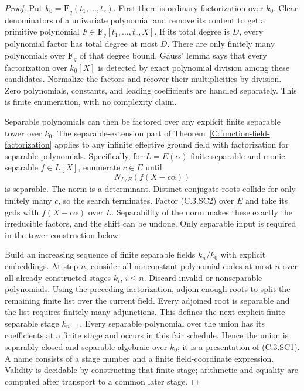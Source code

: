 \begin{proof}
Put $k_0=\mathbf F_q(t_1,\ldots,t_r)$.
First there is ordinary factorization over
$k_0$.  Clear denominators of a univariate
polynomial and remove its content to get
a primitive polynomial
$F\in\mathbf F_q[t_1,\ldots,t_r,X]$.
If its total degree is $D$, every polynomial
factor has total degree at most $D$.
There are only finitely many polynomials
over $\mathbf F_q$ of that degree bound.
Gauss' lemma says that every factorization
over $k_0[X]$ is detected by exact
polynomial division among these candidates.
Normalize the factors and recover their
multiplicities by division.
Zero polynomials, constants, and leading
coefficients are handled separately.
This is finite enumeration, with no
complexity claim.

Separable polynomials can then be factored
over any explicit finite separable tower
over $k_0$.  The separable-extension part
of Theorem~\ref{C:function-field-factorization}
applies to any infinite effective ground
field with factorization for separable
polynomials.  Specifically, for
$L=E(\alpha)$ finite separable and monic
separable $f\in L[X]$, enumerate $c\in E$
until
\[
            N_{L/E}(f(X-c\alpha))                     \tag{C.3.SC2}
\]
is separable.  The norm is a determinant.
Distinct conjugate roots collide for only
finitely many $c$, so the search terminates.
Factor (C.3.SC2) over $E$ and take its
gcds with $f(X-c\alpha)$ over $L$.
Separability of the norm makes these
exactly the irreducible factors, and
the shift can be undone.
Only separable input is required in
the tower construction below.

Build an increasing sequence of finite
separable fields $k_n/k_0$ with explicit
embeddings.  At step $n$, consider all
nonconstant polynomial codes at most $n$ over all
already constructed stages $k_i$, $i\le n$.
Discard invalid or nonseparable polynomials.
Using the preceding factorization, adjoin
enough roots to split the remaining finite
list over the current field.
Every adjoined root is separable and
the list requires finitely many adjunctions.
This defines the next explicit finite
separable stage $k_{n+1}$.
Every separable polynomial over the union
has its coefficients at a finite stage
and occurs in this fair schedule.
Hence the union is separably closed and
separable algebraic over $k_0$; it is a
presentation of (C.3.SC1).
A name consists of a stage number and
a finite field-coordinate expression.
Validity is decidable by constructing
that finite stage; arithmetic and equality
are computed after transport to a common
later stage.


\end{proof}
